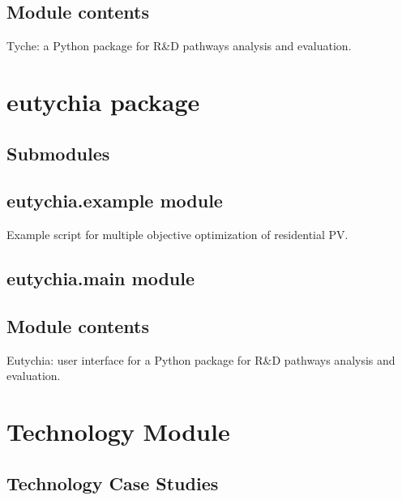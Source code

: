 \documentclass[letterpaper,10pt,english]{sphinxmanual}
\begin{document}
\subsection{Module contents}
\label{\detokenize{tyche:module-tyche}}\label{\detokenize{tyche:module-contents}}
Tyche: a Python package for R\&D pathways analysis and evaluation.


\section{eutychia package}
\label{\detokenize{eutychia:eutychia-package}}\label{\detokenize{eutychia::doc}}

\subsection{Submodules}
\label{\detokenize{eutychia:submodules}}

\subsection{eutychia.example module}
\label{\detokenize{eutychia:module-eutychia.example}}\label{\detokenize{eutychia:eutychia-example-module}}
Example script for multiple objective optimization of residential PV.


\subsection{eutychia.main module}
\label{\detokenize{eutychia:eutychia-main-module}}

\subsection{Module contents}
\label{\detokenize{eutychia:module-eutychia}}\label{\detokenize{eutychia:module-contents}}
Eutychia: user interface for a Python package for R\&D pathways analysis and evaluation.


\section{Technology Module}
\label{\detokenize{technology:technology-module}}\label{\detokenize{technology::doc}}

\subsection{Technology Case Studies}
\label{\detokenize{technology:technology-case-studies}}
\end{document}
